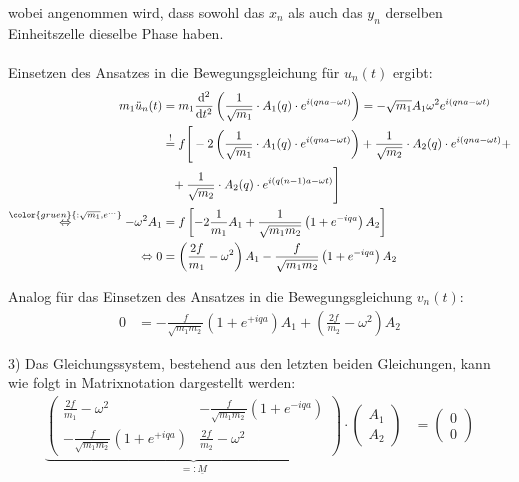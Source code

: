 \documentclass{article}
\newcommand{\diff}{\mathrm{d}}
\newcommand{\lr}[1]{\left(#1\right)}
\newcommand{\lreck}[1]{\left[#1\right]}
\newcommand{\comment}[1]{{\color{gruen}{#1}}}
\begin{document}
{	wobei angenommen wird, dass sowohl das $x_n$ als auch das $y_n$ derselben Einheitszelle dieselbe Phase haben.\\
	\\
	Einsetzen des Ansatzes in die Bewegungsgleichung für $u_n(t)$ ergibt:
		\begin{align*}
			m_1 \ddot{u}_n(t) &= m_1 \frac{\diff^2}{\diff t^2} \lr{ \frac{1}{\sqrt{m_1}} \cdot A_1(q) \cdot e^{i(qna - \omega t)} } = - \sqrt{m_1} A_1 \omega^2 e^{i(qna - \omega t)} \\
			&\stackrel{!}{=} f \Bigg[ -2 \lr{ \frac{1}{\sqrt{m_1}} \cdot A_1(q) \cdot e^{i(qna - \omega t)} }  + \frac{1}{\sqrt{m_2}} \cdot A_2(q) \cdot e^{i(qna - \omega t)} + \\
			&\phantom{=} + \frac{1}{\sqrt{m_2}} \cdot A_2(q) \cdot e^{i(q(n-1)a - \omega t)} \Bigg] \\
			\stackrel{ \comment{ :\sqrt{m_1}, e^{...} } }{\Leftrightarrow} -\omega^2 A_1 &= f \lreck{ -2\frac{1}{m_1} A_1 + \frac{1}{\sqrt{m_1 m_2}} \lr{ 1 + e^{-iqa} } A_2 } \\
			\Leftrightarrow 0 &= \lr{ \frac{2f}{m_1} - \omega^2 } A_1 - \frac{f}{\sqrt{m_1 m_2}} \lr{1 + e^{-iqa}} A_2
		\end{align*}
	
	Analog für das Einsetzen des Ansatzes in die Bewegungsgleichung $v_n(t)$:
		\begin{align*}
			0 &= - \frac{f}{\sqrt{m_1 m_2}} \lr{ 1 + e^{+iqa} } A_1 + \lr{ \frac{2f}{m_2} - \omega^2 } A_2
		\end{align*}


	3) Das Gleichungssystem, bestehend aus den letzten beiden Gleichungen, kann wie folgt in Matrixnotation dargestellt werden:
		\begin{align*}
			\underbrace{
			\begin{pmatrix}
				\frac{2f}{m_1} - \omega^2 & -\frac{f}{\sqrt{m_1 m_2}} \lr{ 1 + e^{-iqa} } \\
				-\frac{f}{\sqrt{m_1 m_2}} \lr{ 1 + e^{+iqa} } & \frac{2f}{m_2} - \omega^2
			\end{pmatrix}
			}_{=:\underline{M}}
			\cdot
			\begin{pmatrix}
				A_1 \\ A_2
			\end{pmatrix}
			&=
			\begin{pmatrix}
				0 \\ 0
			\end{pmatrix}
		\end{align*}


}
\end{document}
